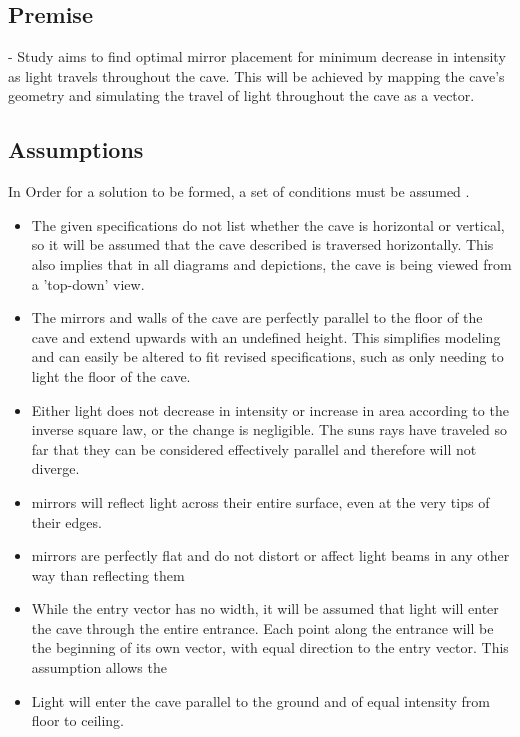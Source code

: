 \documentclass[11pt, letterpaper]{article}
\begin{document}
\subsection{Premise}
- Study aims to find optimal mirror placement for minimum decrease in intensity as light travels throughout the cave. This will be achieved by mapping the cave's geometry and simulating the travel of light throughout the cave as a vector. 




\subsection{Assumptions} 
\par
In Order for a solution to be formed, a set of conditions must be assumed .
\begin{itemize}

	\item The given specifications do not list whether the cave is horizontal or vertical, so it will be assumed that the cave described is traversed horizontally. This also implies that in all diagrams and depictions, the cave is being viewed from a 'top-down' view.
	
	\item The mirrors and walls of the cave are perfectly parallel to the floor of the cave and extend upwards with an undefined height. This simplifies modeling and can easily be altered to fit revised specifications, such as only needing to light the floor of the cave.
	

	\item Either light does not decrease in intensity or increase in area according to the inverse square law, or the change is negligible. The suns rays have traveled so far that they can be considered effectively parallel and therefore will not diverge. 
	\cite{yasuda_2024_why}
		
	\item mirrors will reflect light across their entire surface, even at the very tips of their edges. 
	
	\item mirrors are perfectly flat and do not distort or affect light beams in any other way than reflecting them
	
	\item While the entry vector has no width, it will be assumed that light will enter the cave through the entire entrance. Each point along the entrance will be the beginning of its own vector, with equal direction to the entry vector. This assumption allows the 
	
		
	\item Light will enter the cave parallel to the ground and of equal intensity from floor to ceiling.
	

\end{itemize}
\end{document}
